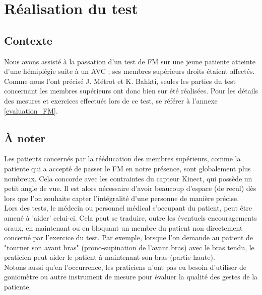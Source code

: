 \documentclass[french,12pt]{report}
\begin{document}
	\section{Réalisation du test}
				\subsection{Contexte}
Nous avons assisté à la passation d'un test de FM sur une jeune patiente atteinte d'une hémiplégie suite à un AVC ; ses membres supérieurs droits étaient affectés. Comme nous l'ont précisé J. Métrot et K. Bahkti, seules les parties du test concernant les membres supérieurs ont donc bien sur été réalisées. Pour les détails des mesures et exercices effectués lors de ce test, se référer à l'annexe \ref{evaluation_FM}.

				\subsection{À noter}
Les patients concernés par la rééducation des membres supérieurs, comme la patiente qui a accepté de passer 
le FM en notre présence, sont globalement plus nombreux. Cela concorde avec les contraintes du capteur Kinect, 
qui possède un petit angle de vue. Il est alors nécessaire d'avoir beaucoup d'espace (de recul) dès lors que 
l'on souhaite capter l'intégralité d'une personne de manière précise. \\
Lors des tests, le médecin ou personnel médical s'occupant du patient, peut être amené à 'aider' celui-ci.
Cela peut se traduire, outre les éventuels encouragements oraux, en maintenant ou en bloquant un membre du patient
non directement concerné par l'exercice du test. Par exemple, lorsque l'on demande au patient de "tourner son avant 
bras" (prono-supination de l'avant bras) avec le bras tendu, le praticien peut aider le patient à maintenant son bras
(partie haute).\\
Notons aussi qu'en l'occurrence, les praticiens n'ont pas eu besoin d'utiliser de goniomètre ou autre instrument de 
mesure pour évaluer la qualité des gestes de la patiente.
		
\end{document}
